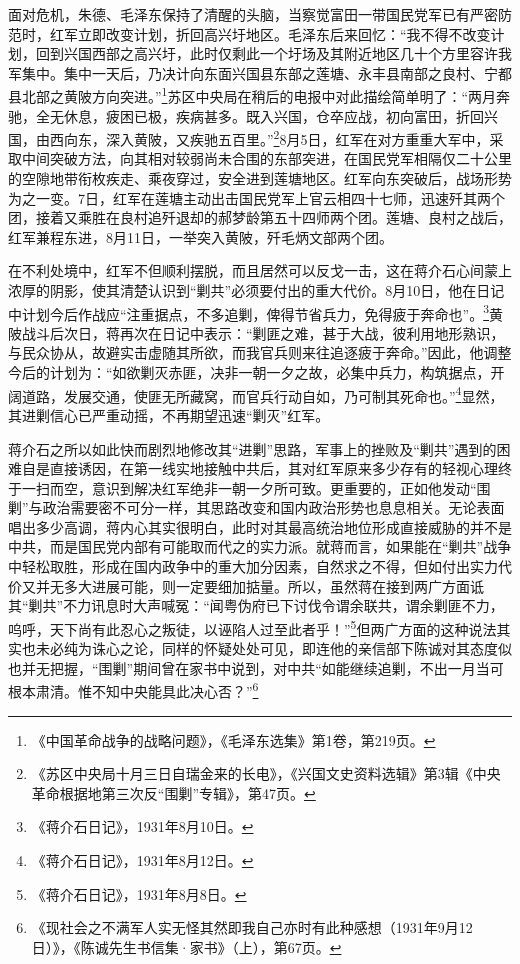 面对危机，朱德、毛泽东保持了清醒的头脑，当察觉富田一带国民党军已有严密防范时，红军立即改变计划，折回高兴圩地区。毛泽东后来回忆：“我不得不改变计划，回到兴国西部之高兴圩，此时仅剩此一个圩场及其附近地区几十个方里容许我军集中。集中一天后，乃决计向东面兴国县东部之莲塘、永丰县南部之良村、宁都县北部之黄陂方向突进。”\footnote{《中国革命战争的战略问题》，《毛泽东选集》第1卷，第219页。}苏区中央局在稍后的电报中对此描绘简单明了：“两月奔驰，全无休息，疲困已极，疾病甚多。既入兴国，仓卒应战，初向富田，折回兴国，由西向东，深入黄陂，又疾驰五百里。”\footnote{《苏区中央局十月三日自瑞金来的长电》，《兴国文史资料选辑》第3辑《中央革命根据地第三次反“围剿”专辑》，第47页。}8月5日，红军在对方重重大军中，采取中间突破方法，向其相对较弱尚未合围的东部突进，在国民党军相隔仅二十公里的空隙地带衔枚疾走、乘夜穿过，安全进到莲塘地区。红军向东突破后，战场形势为之一变。7日，红军在莲塘主动出击国民党军上官云相四十七师，迅速歼其两个团，接着又乘胜在良村追歼退却的郝梦龄第五十四师两个团。莲塘、良村之战后，红军兼程东进，8月11日，一举突入黄陂，歼毛炳文部两个团。


在不利处境中，红军不但顺利摆脱，而且居然可以反戈一击，这在蒋介石心间蒙上浓厚的阴影，使其清楚认识到“剿共”必须要付出的重大代价。8月10日，他在日记中计划今后作战应“注重据点，不多追剿，俾得节省兵力，免得疲于奔命也”。\footnote{《蒋介石日记》，1931年8月10日。}黄陂战斗后次日，蒋再次在日记中表示：“剿匪之难，甚于大战，彼利用地形熟识，与民众协从，故避实击虚随其所欲，而我官兵则来往追逐疲于奔命。”因此，他调整今后的计划为：“如欲剿灭赤匪，决非一朝一夕之故，必集中兵力，构筑据点，开阔道路，发展交通，使匪无所藏窝，而官兵行动自如，乃可制其死命也。”\footnote{《蒋介石日记》，1931年8月12日。}显然，其进剿信心已严重动摇，不再期望迅速“剿灭”红军。


蒋介石之所以如此快而剧烈地修改其“进剿”思路，军事上的挫败及“剿共”遇到的困难自是直接诱因，在第一线实地接触中共后，其对红军原来多少存有的轻视心理终于一扫而空，意识到解决红军绝非一朝一夕所可致。更重要的，正如他发动“围剿”与政治需要密不可分一样，其思路改变和国内政治形势也息息相关。无论表面唱出多少高调，蒋内心其实很明白，此时对其最高统治地位形成直接威胁的并不是中共，而是国民党内部有可能取而代之的实力派。就蒋而言，如果能在“剿共”战争中轻松取胜，形成在国内政争中的重大加分因素，自然求之不得，但如付出实力代价又并无多大进展可能，则一定要细加掂量。所以，虽然蒋在接到两广方面诋其“剿共”不力讯息时大声喊冤：“闻粤伪府已下讨伐令谓余联共，谓余剿匪不力，呜呼，天下尚有此忍心之叛徒，以诬陷人过至此者乎！”\footnote{《蒋介石日记》，1931年8月8日。}但两广方面的这种说法其实也未必纯为诛心之论，同样的怀疑处处可见，即连他的亲信部下陈诚对其态度似也并无把握，“围剿”期间曾在家书中说到，对中共“如能继续追剿，不出一月当可根本肃清。惟不知中央能具此决心否？”\footnote{《现社会之不满军人实无怪其然即我自己亦时有此种感想（1931年9月12日）》，《陈诚先生书信集·家书》（上），第67页。}


